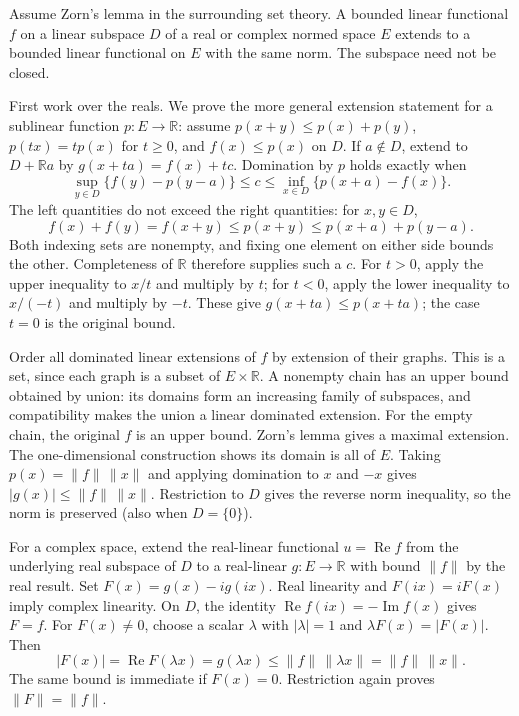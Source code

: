 \begin{theorem}
Assume Zorn's lemma in the surrounding set theory. A bounded linear
functional $f$ on a linear subspace $D$ of a real or complex normed
space $E$ extends to a bounded linear functional on $E$ with the same
norm. The subspace need not be closed.
\end{theorem}
\Proof
First work over the reals. We prove the more general extension statement
for a sublinear function $p:E\to\mathbb R$: assume $p(x+y)\leq p(x)+p(y)$,
$p(tx)=tp(x)$ for $t\geq0$, and $f(x)\leq p(x)$ on $D$.
If $a\notin D$, extend to $D+\mathbb Ra$ by
$g(x+ta)=f(x)+tc$. Domination by $p$ holds exactly when
\[
\sup_{y\in D}\{f(y)-p(y-a)\}
\leq c\leq
\inf_{x\in D}\{p(x+a)-f(x)\}.
\]
The left quantities do not exceed the right quantities: for $x,y\in D$,
\[
f(x)+f(y)=f(x+y)\leq p(x+y)\leq p(x+a)+p(y-a).
\]
Both indexing sets are nonempty, and fixing one element on either side
bounds the other. Completeness of $\mathbb R$ therefore supplies such a
$c$. For $t>0$, apply the upper inequality to $x/t$ and multiply by $t$;
for $t<0$, apply the lower inequality to $x/(-t)$ and multiply by $-t$.
These give $g(x+ta)\leq p(x+ta)$; the case $t=0$ is the original bound.

Order all dominated linear extensions of $f$ by extension of their
graphs. This is a set, since each graph is a subset of $E\times\mathbb R$.
A nonempty chain has an upper bound obtained by union: its domains form
an increasing family of subspaces, and compatibility makes the union a
linear dominated extension. For the empty chain, the original $f$ is
an upper bound. Zorn's lemma gives a maximal extension.
The one-dimensional construction shows its domain is all of $E$.
Taking $p(x)=\|f\|\,\|x\|$ and applying domination to $x$ and $-x$
gives $|g(x)|\leq\|f\|\,\|x\|$. Restriction to $D$ gives the reverse
norm inequality, so the norm is preserved (also when $D=\{0\}$).

For a complex space, extend the real-linear functional
$u=\operatorname{Re}f$ from the underlying real subspace of $D$ to a
real-linear $g:E\to\mathbb R$ with bound $\|f\|$ by the real result.
Set $F(x)=g(x)-i g(ix)$. Real linearity and
$F(ix)=iF(x)$ imply complex linearity. On $D$, the identity
$\operatorname{Re}f(ix)=-\operatorname{Im}f(x)$ gives $F=f$.
For $F(x)\ne0$, choose a scalar $\lambda$ with $|\lambda|=1$ and
$\lambda F(x)=|F(x)|$. Then
\[
|F(x)|=\operatorname{Re}F(\lambda x)=g(\lambda x)
\leq\|f\|\,\|\lambda x\|=\|f\|\,\|x\|.
\]
The same bound is immediate if $F(x)=0$. Restriction again proves
$\|F\|=\|f\|$.
\Done

